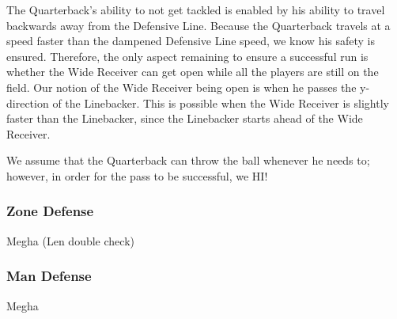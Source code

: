 The Quarterback’s ability to not get tackled is enabled by his ability to travel backwards away from the Defensive Line. Because the Quarterback travels at a speed faster than the dampened Defensive Line speed, we know his safety is ensured. Therefore, the only aspect remaining to ensure a successful run is whether the Wide Receiver can get open while all the players are still on the field. Our notion of the Wide Receiver being open is when he passes the y-direction of the Linebacker. This is possible when the Wide Receiver is slightly faster than the Linebacker, since the Linebacker starts ahead of the Wide Receiver.

We assume that the Quarterback can throw the ball whenever he needs to; however, in order for the pass to be successful, we HI! 

\subsubsection{Zone Defense}

Megha (Len double check)

\subsubsection{Man Defense}

Megha 